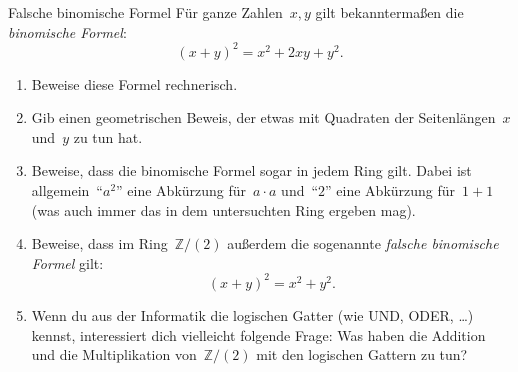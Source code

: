 \documentclass{../zirkelblatt}
\newcommand{\ZZ}{\mathbb{Z}}
\begin{document}
\begin{aufgabe}{Falsche binomische Formel}
Für ganze Zahlen~$x,y$ gilt bekanntermaßen die \emph{binomische Formel}:
\[ (x+y)^2 = x^2 + 2xy + y^2. \]
\begin{enumerate}
\item Beweise diese Formel rechnerisch.
\item Gib einen geometrischen Beweis, der etwas mit Quadraten der
Seitenlängen~$x$ und~$y$ zu tun hat.
\item Beweise, dass die binomische Formel sogar in jedem Ring gilt. Dabei ist allgemein~"`$a^2$"'
eine Abkürzung für~$a \cdot a$ und~"`$2$"' eine Abkürzung für~$1 + 1$ (was auch
immer das in dem untersuchten Ring ergeben mag).
\item Beweise, dass im Ring~$\ZZ/(2)$ außerdem die sogenannte
\emph{falsche binomische Formel} gilt:
\[ (x+y)^2 = x^2 + y^2. \]
\item Wenn du aus der Informatik die logischen Gatter (wie UND, ODER, \ldots)
kennst, interessiert dich vielleicht folgende Frage: Was haben die Addition und
die Multiplikation von~$\ZZ/(2)$ mit den logischen Gattern zu tun?
\end{enumerate}
\end{aufgabe}
\end{document}
